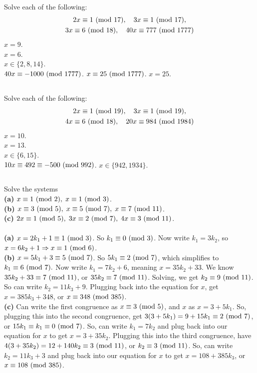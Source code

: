 \documentclass{article}
\begin{document}
\subsection{}
Solve each of the following:
\begin{gather*}
    2x \equiv 1 \ (\mathrm{mod}\ 17), \quad 3x \equiv 1 \ (\mathrm{mod}\ 17),\\
    3x \equiv 6 \ (\mathrm{mod}\ 18), \quad 40x \equiv 777 \ (\mathrm{mod}\ 1777)
\end{gather*}
$x = 9$.\\
$x = 6$.\\
$x \in \{2, 8, 14\}$.\\
$40x \equiv -1000 \ (\mathrm{mod}\ 1777)$. $x \equiv 25 \ (\mathrm{mod}\ 1777)$. $x = 25$.

\subsection{}
Solve each of the following:
\begin{gather*}
    2x \equiv 1 \ (\mathrm{mod}\ 19), \quad 3x \equiv 1 \ (\mathrm{mod}\ 19),\\
    4x \equiv 6 \ (\mathrm{mod}\ 18), \quad 20x \equiv 984 \ (\mathrm{mod}\ 1984)
\end{gather*}
$x = 10$.\\
$x = 13$.\\
$x \in \{6, 15\}$.\\
$10x \equiv 492 \equiv -500 \ (\mathrm{mod}\ 992)$. $x \in \{942, 1934\}$.

\subsection{}
Solve the systems\\
\textbf{(a)} $x \equiv 1 \ (\mathrm{mod}\ 2), \; x \equiv 1 \ (\mathrm{mod}\ 3)$.\\
\textbf{(b)}
$x \equiv 3 \ (\mathrm{mod}\ 5), \; x \equiv 5 \ (\mathrm{mod}\ 7), \; x \equiv 7 \ (\mathrm{mod}\ 11)$.\\
\textbf{(c)}
$2x \equiv 1 \ (\mathrm{mod}\ 5), \; 3x \equiv 2 \ (\mathrm{mod}\ 7), \; 4x \equiv 3 \ (\mathrm{mod}\ 11)$.\\~\\
\textbf{(a)} $x = 2k_1 + 1 \equiv 1 \ (\mathrm{mod}\ 3)$. So $k_1 \equiv 0 \ (\mathrm{mod}\ 3)$.
Now write $k_1 = 3k_2$, so $x = 6k_2 + 1 \Rightarrow x \equiv 1 \ (\mathrm{mod}\ 6)$.\\
\textbf{(b)} $x = 5k_1 + 3 \equiv 5 \ (\mathrm{mod}\ 7)$.
So $5k_1 \equiv 2 \ (\mathrm{mod}\ 7)$, which simplifies to $k_1 \equiv 6 \ (\mathrm{mod}\ 7).$
Now write $k_1 = 7k_2 + 6$, meaning $x = 35k_2 + 33$.
We know $35k_2 + 33 \equiv 7 \ (\mathrm{mod}\ 11)$, or $35k_2 \equiv 7 \ (\mathrm{mod}\ 11)$.
Solving, we get $k_2 \equiv 9 \ (\mathrm{mod}\ 11)$.
So can write $k_2 = 11k_3 + 9$.
Plugging back into the equation for $x$, get
$x = 385k_3 + 348$, or $x \equiv 348 \ (\mathrm{mod}\ 385)$.\\
\textbf{(c)}
Can write the first congruence as $x \equiv 3 \ (\mathrm{mod}\ 5)$, and $x$ as $x = 3 + 5k_1$.
So, plugging this into the second congruence, get
$3(3 + 5k_1) = 9 + 15k_1 \equiv 2 \ (\mathrm{mod}\ 7)$, or $15k_1 \equiv k_1 \equiv 0 \ (\mathrm{mod}\ 7)$.
So, can write $k_1 = 7k_2$ and plug back into our equation for
$x$ to get $x = 3 + 35k_2$.
Plugging this into the third congruence, have
$4(3 + 35k_2) = 12 + 140k_2 \equiv 3 \ (\mathrm{mod}\ 11)$, or $k_2 \equiv 3 \ (\mathrm{mod}\ 11)$.
So, can write $k_2 = 11k_3 + 3$ and plug back into our equation for
$x$ to get $x = 108 + 385k_3$, or $x \equiv 108 \ (\mathrm{mod}\ 385)$.
\end{document}
